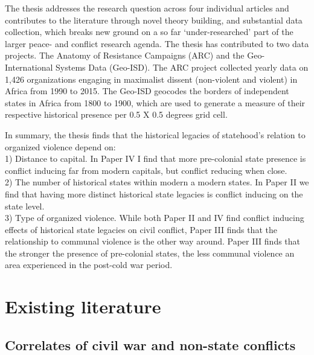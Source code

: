 The thesis addresses the research question across four individual articles and
contributes to the literature through novel theory building, and substantial data
collection, which breaks new ground on a so far `under-researched' part of the
larger peace- and conflict research agenda. The thesis has contributed to two data
projects. The Anatomy of Resistance Campaigns (ARC) and the Geo-International
Systems Data (Geo-ISD). The ARC project collected yearly data on 1,426
organizations engaging in maximalist dissent (non-violent and violent) in Africa
from 1990 to 2015. The Geo-ISD geocodes the borders of independent states in
Africa from 1800 to 1900, which are used to generate a measure of their
respective historical presence per 0.5 X 0.5 degrees grid cell. 

In summary, the thesis finds that the historical legacies of statehood's
relation to organized violence depend on:\\

1) Distance to capital. In Paper IV I find that more pre-colonial state presence
is conflict inducing far from modern capitals, but conflict reducing when
close.\\

2) The number of historical states within modern a modern states. In Paper II we
find that having more distinct historical state legacies is conflict inducing on
the state level.\\

3) Type of organized violence. While both Paper II and IV find conflict inducing
effects of historical state legacies on civil conflict, Paper III finds that the
relationship to communal violence is the other way around. Paper III finds that
the stronger the presence of pre-colonial states, the less communal violence an
area experienced in the post-cold war period.

\section{Existing literature} \label{Existing literature}

\subsection{Correlates of civil war and non-state conflicts} 
\label{Correlates of civil war and non-state conflicts}

